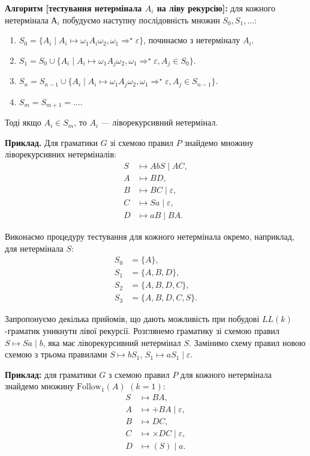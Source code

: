 \textbf{Алгоритм [тестування нетермінала $A_i$ на ліву рекурсію]:} для кожного нетермінала $А_i$ побудуємо наступну послідовність множин $S_0, S_1, \ldots$:
\begin{enumerate}
	\item $S_0 = \{A_i \mid A_i \mapsto \omega_1 A_i \omega_2, \omega_1 \Rightarrow^\star \varepsilon \}$, починаємо з нетерміналу $A_i$.
	\item $S_1 = S_0 \cup \{ A_i \mid A_i \mapsto \omega_1 A_j \omega_2, \omega_1 \Rightarrow^\star \varepsilon, A_j \in S_0\}$.
	\item $S_n = S_{n-1} \cup \{ A_i \mid A_i \mapsto \omega_1 A_j \omega_2, \omega_1 \Rightarrow^\star \varepsilon, A_j \in S_{n-1}\}$.
	\item $S_m = S_{m + 1} = \ldots$.
\end{enumerate}

Тоді якщо $A_i \in S_m$, то $A_i$ --- ліворекурсивний нетермінал.\medskip

\textbf{Приклад.} Для граматики $G$ зі схемою правил $P$ знайдемо множину ліворекурсивних нетерміналів:
\begin{align*}
S &\mapsto AbS \mid AC, \\
A &\mapsto BD, \\
B &\mapsto BC \mid \varepsilon, \\
C &\mapsto Sa \mid \varepsilon, \\
D &\mapsto aB \mid BA.
\end{align*}

Виконаємо процедуру тестування для кожного нетермінала окремо, наприклад, для нетермінала $S$: 
\begin{align*}
S_0 &= \{A\}, \\
S_1 &= \{A, B, D\}, \\
S_2 &= \{A, B, D, C\}, \\
S_3 &= \{A, B, D, C, S\}.
\end{align*}

Запропонуємо декілька прийомів, що дають можливість при побудові $LL(k)$-граматик уникнути лівої рекурсії. Розглянемо граматику зі схемою правил $S \mapsto Sa \mid b$, яка має ліворекурсивний нетермінал $S$. Замінимо схему правил новою схемою з трьома правилами $S \mapsto bS_1$, $S_1 \mapsto aS_1 \mid \varepsilon$. \medskip

\textbf{Приклад:} для граматики $G$ з схемою правил $P$ для кожного нетермінала знайдемо множину $\text{Follow}_1(A)$ $(k=1)$:
\begin{align*}
	S &\mapsto BA, \\
	A &\mapsto +BA \mid \varepsilon, \\
	B &\mapsto DC, \\
	C &\mapsto \times DC \mid \varepsilon, \\
	D &\mapsto (S) \mid a.
\end{align*}

